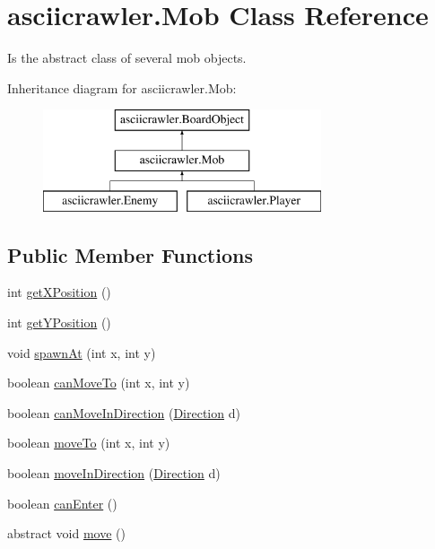 \hypertarget{classasciicrawler_1_1Mob}{}\section{asciicrawler.\+Mob Class Reference}
\label{classasciicrawler_1_1Mob}


Is the abstract class of several mob objects.  


Inheritance diagram for asciicrawler.\+Mob\+:\begin{figure}[H]
\begin{center}
\leavevmode
\includegraphics[height=3.000000cm]{classasciicrawler_1_1Mob}
\end{center}
\end{figure}
\subsection*{Public Member Functions}
\begin{DoxyCompactItemize}
\item 
int \hyperlink{classasciicrawler_1_1Mob_a10163bd48f4b365f0921a8b65f563017}{get\+X\+Position} ()
\item 
int \hyperlink{classasciicrawler_1_1Mob_a39572c2eb4a9dee3b92bd8094afffa9c}{get\+Y\+Position} ()
\item 
void \hyperlink{classasciicrawler_1_1Mob_a9029cbfef7c48ed085d387d8d6b0729d}{spawn\+At} (int x, int y)
\item 
boolean \hyperlink{classasciicrawler_1_1Mob_a494c5ae18f448b3dd98e7147d6e4c3db}{can\+Move\+To} (int x, int y)
\item 
boolean \hyperlink{classasciicrawler_1_1Mob_aee5629a34d8789bbec9918326fdd9612}{can\+Move\+In\+Direction} (\hyperlink{enumasciicrawler_1_1Direction}{Direction} d)
\item 
boolean \hyperlink{classasciicrawler_1_1Mob_a5f48e61e860b75d4de72e08321eaefed}{move\+To} (int x, int y)
\item 
boolean \hyperlink{classasciicrawler_1_1Mob_a2f215e78034f453c0769e04d5676384c}{move\+In\+Direction} (\hyperlink{enumasciicrawler_1_1Direction}{Direction} d)
\item 
boolean \hyperlink{classasciicrawler_1_1Mob_ad9f62c59a65cb1e8ab2f54d5a8e2fbe3}{can\+Enter} ()
\item 
abstract void \hyperlink{classasciicrawler_1_1Mob_a63b3e36b978aa3355d02e4a0b0906b0b}{move} ()
\end{DoxyCompactItemize}
